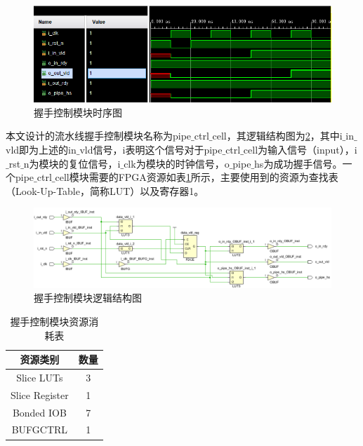 \begin{figure}[htb]
    \centering
    \includegraphics[width=14cm]{fig/5-fig/握手控制模块时序图.jpg}
    \caption{握手控制模块时序图}
    \label{fig:握手控制模块时序图}
\end{figure}

本文设计的流水线握手控制模块名称为pipe$\_$ctrl$\_$cell，其逻辑结构图为\ref{fig:握手控制模块逻辑结构图}，其中i$\_$in$\_$vld即为上述的in$\_$vld信号，i表明这个信号对于pipe$\_$ctrl$\_$cell为输入信号（input），i$\_$rst$\_$n为模块的复位信号，i$\_$clk为模块的时钟信号，o$\_$pipe$\_$hs为成功握手信号。一个pipe$\_$ctrl$\_$cell模块需要的FPGA资源如表\ref{tab:握手控制模块资源消耗表}所示，主要使用到的资源为查找表（Look-Up-Table，简称LUT）以及寄存器1。
\begin{figure}[htb]
    \centering
    \includegraphics[width=14cm]{fig/5-fig/握手控制模块逻辑结构图.jpg}
    \caption{握手控制模块逻辑结构图}
    \label{fig:握手控制模块逻辑结构图}
  \end{figure}

  \begin{table}[H]
    \centering
    \caption{握手控制模块资源消耗表}
    \label{tab:握手控制模块资源消耗表}
    \begin{tabular}{c|c}
        \hline
        资源类别             & 数量  \\ \hline
        Slice LUTs          & 3     \\ \hline
        Slice Register      & 1     \\ \hline
        Bonded IOB          & 7     \\ \hline
        BUFGCTRL            & 1     \\ \hline
    \end{tabular}
  \end{table}

